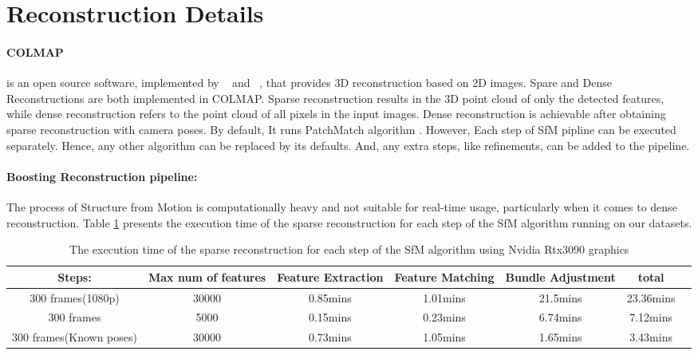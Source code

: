 \documentclass[11pt]{article}
\begin{document}
    \clearpage
    \section{Reconstruction Details}

    \paragraph{COLMAP} is an open source software, implemented by ~\cite{schoenberger2016sfm} and ~\cite{schoenberger2016mvs},
    that provides 3D reconstruction based on 2D images. Spare and Dense Reconstructions are both implemented in COLMAP.
    Sparse reconstruction results in the 3D point cloud of only the detected features, while dense reconstruction
    refers to the point cloud of all pixels in the input images. Dense reconstruction is achievable after obtaining
    sparse reconstruction with camera poses. By default, It runs PatchMatch algorithm \cite{journals/tog/BarnesSFG09}.
    However, Each step of SfM pipline can be executed separately. Hence, any other algorithm can be replaced by
    its defaults. And, any extra steps, like refinements, can be added to the pipeline.

    \paragraph{Boosting Reconstruction pipeline:}
    The process of Structure from Motion is computationally heavy and not suitable for real-time usage,
    particularly when it comes to dense reconstruction. Table \ref{tab:exe_time} presents the execution time of the sparse reconstruction
    for each step of the SfM algorithm running on our datasets.
    \begin{table}[htb]
        \centering
        \begin{adjustbox}{max width=\textwidth}
            \begin{tabular}{|c|c|c|c|c|c|c|}
                \hline
                 Steps:                 & Max num of features & Feature Extraction & Feature Matching & Bundle Adjustment & total    \\
                \hline
                300 frames(1080p)       & 30000               & 0.85mins           & 1.01mins          & 21.5mins          & 23.36mins \\
                \hline
                300 frames              & 5000                & 0.15mins           & 0.23mins          & 6.74mins          & 7.12mins \\
                \hline
                300 frames(Known poses) & 30000               & 0.73mins           & 1.05mins          & 1.65mins          & 3.43mins \\
                \hline
            \end{tabular}
        \end{adjustbox}
        \caption{The execution time of the sparse reconstruction for each step of the SfM algorithm using Nvidia Rtx3090 graphics}
        \label{tab:exe_time}
    \end{table}
\end{document}
